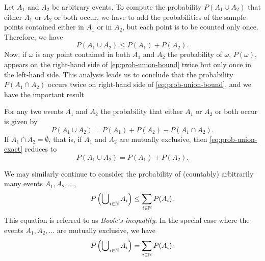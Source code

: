 Let \(A_1\) and \(A_2\) be arbitrary events. To compute the probability
\(P(A_1\cup A_2)\) that either \(A_1\) or \(A_2\) or both occur, we have to
add the probabilities of the sample points contained either in \(A_1\) or
in \(A_2\), but each point is to be counted only once. Therefore, we have
\begin{equation}
  \label{eq:prob-union-bound}
  P(A_1\cup A_2)\leq P(A_1)+P(A_2).
\end{equation}
Now, if \(\omega\) is any point contained in both \(A_1\) and \(A_2\) the
probability of \(\omega\), \(P(\omega)\), appears on the right-hand side of
\eqref{ep:prob-union-bound} twice but only once in the left-hand side. This
analysis leads us to conclude that the probability \(P(A_1\cap A_2)\)
occurs twice on right-hand side of \eqref{eq:prob-union-bound}, and we have
the important result
\begin{theorem}
  For any two events \(A_1\) and \(A_2\) the probability that either
  \(A_1\) or \(A_2\) or both occur is given by
  \begin{equation}
    \label{eq:prob-union-exact}
    P(A_1\cup A_2)=P(A_1)+P(A_2)-P(A_1\cap A_2).
  \end{equation}
  If \(A_1\cap A_2=\emptyset\), that is, if \(A_1\) and \(A_2\) are
  mutually exclusive, then \eqref{eq:prob-union-exact} reduces to
  \[
    P(A_1\cup A_2)=P(A_1)+P(A_2).
  \]
\end{theorem}

We may similarly continue to consider the probability of (countably)
arbitrarily many events \(A_1,A_2,\dotsc\),
\begin{equation}
  \label{eq:booles-inequality}
  P\left( \bigcup\nolimits_{i\in\mathbb{N}} A_i\right)\leq \sum_{i\in\mathbb{N}} P(A_i).
\end{equation}
This equation is referred to as \emph{Boole's inequality}. In the special
case where the events \(A_1,A_2,\dotsc\) are mutually exclusive, we have
\[
  P\left( \bigcup\nolimits_{i\in\mathbb{N}} A_i\right)=\sum_{i\in\mathbb{N}} P(A_i).
\]

